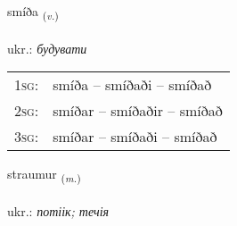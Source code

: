 \documentclass[frontgrid, backgrid]{flacards}\usepackage[]{graphicx}\usepackage[]{xcolor}
\begin{document}
\renewcommand{\flhead}{\vskip5pt \fboxsep=0pt {\small\bfseries\footnotesize Sagnorð | дієслово}}
\renewcommand{\fcfoot}{\vskip5pt \fboxsep=0pt \hspace{2pt}{\small\bfseries\footnotesize 2K}}

\renewcommand{\blhead}{\vskip5pt {\small\bfseries\footnotesize Sagnorð | дієслово }}
\renewcommand{\bcfoot}{\vskip5pt \hspace{2pt}{\small\bfseries\footnotesize 2K}}


{smíða \small{\textsubscript{(\textit{v.})}} \\[1ex] %
\textphonetic{[smiːða]} \\
ukr.: \emph{будувати} \\  [2ex]
\renewcommand*{\arraystretch}{0.8}
\begin{tabular}{p{1cm}l}
\textsc{1sg}: & smíða -- smíðaði -- smíðað \\ 
\textsc{2sg}: & smíðar -- smíðaðir -- smíðað \\ 
\textsc{3sg}: & smíðar -- smíðaði -- smíðað \\ 
\end{tabular}
}

\renewcommand{\flhead}{\vskip5pt \fboxsep=0pt {\small\bfseries\footnotesize Nafnorð | іменник}}
\renewcommand{\fcfoot}{\vskip5pt \fboxsep=0pt \hspace{2pt}{\small\bfseries\footnotesize 2K}}

\renewcommand{\blhead}{\vskip5pt {\small\bfseries\footnotesize Nafnorð | іменник }}
\renewcommand{\bcfoot}{\vskip5pt \hspace{2pt}{\small\bfseries\footnotesize 2K}}


{straumur \small{\textsubscript{(\textit{m.})}} \\[1ex] %
\textphonetic{[strœiːmʏr]} \\
ukr.: \emph{потіік; течія} \\  [2ex]
\renewcommand*{\arraystretch}{0.8}
}
\end{document}
